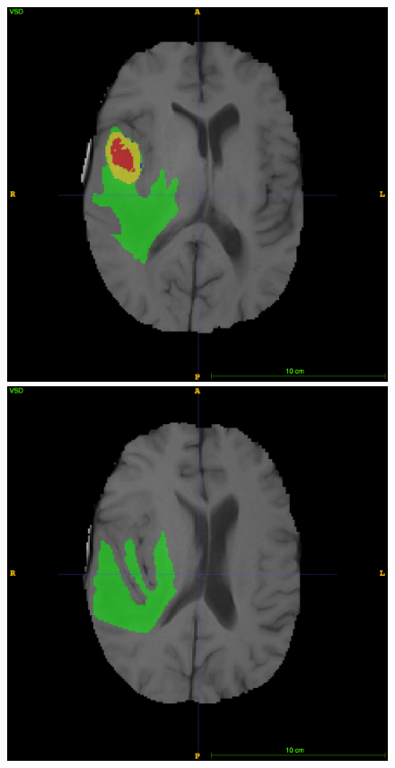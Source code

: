 \documentclass[12pt,a4paper,twoside,openright]{report}
\begin{document}
\begin{figure}
	\includegraphics[scale=0.1]{expert_segmentation_99}
	\includegraphics[scale=0.1]{expert_segmentation_109}

\end{figure}
\end{document}
